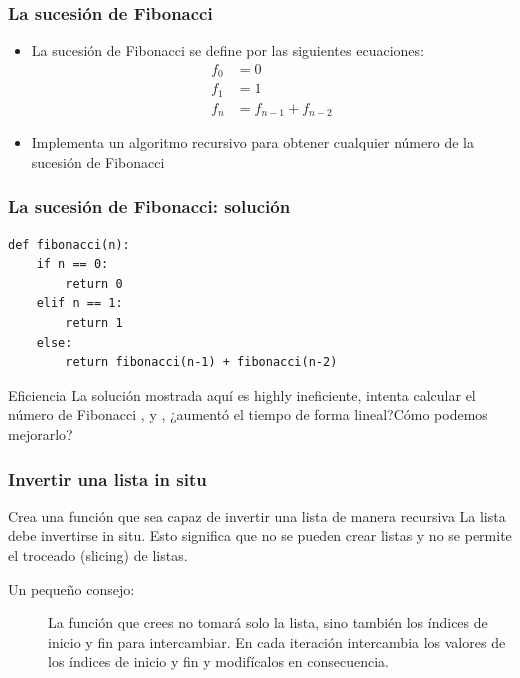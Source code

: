 \documentclass[11pt]{beamer}
\begin{document}
	\begin{frame}\frametitle{La sucesión de Fibonacci}
	\begin{itemize}
	\item La sucesión de Fibonacci se define por las siguientes ecuaciones:
	\begin{equation*}
	\begin{aligned}
	f_0 &= 0\\
f_1 &= 1\\
f_n &= f_{n-1} + f_{n-2}
	\end{aligned}
	\end{equation*}
	\item Implementa un algoritmo recursivo para obtener cualquier número de la sucesión de Fibonacci
	\end{itemize}
	\end{frame}

	\begin{frame}[fragile]\frametitle{La sucesión de Fibonacci: solución}
	\begin{lstlisting}
def fibonacci(n):
	if n == 0:
		return 0
	elif n == 1:
		return 1
	else:
		return fibonacci(n-1) + fibonacci(n-2)
\end{lstlisting}
	\begin{block}{Eficiencia}
La solución mostrada aquí es highly ineficiente, intenta calcular el número de Fibonacci ,  y , ¿aumentó el tiempo de forma lineal?\¿Cómo podemos mejorarlo?
	\end{block}
	\end{frame}

	\begin{frame}\frametitle{Invertir una lista in situ}
	\begin{block}{Crea una función que sea capaz de invertir una lista de manera recursiva}
La lista debe invertirse in situ. Esto significa que no se pueden crear listas y no se permite el troceado (slicing) de listas.
\end{block}
	\begin{description}
	\item[Un pequeño consejo:] La función que crees no tomará solo la lista, sino también los índices de inicio y fin para intercambiar. En cada iteración intercambia los valores de los índices de inicio y fin y modifícalos en consecuencia.
	\end{description}
	\end{frame}

	
\end{document}
